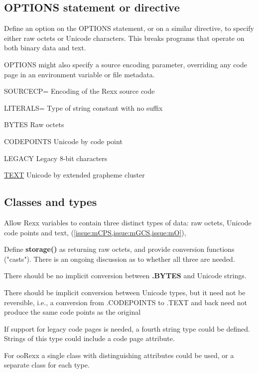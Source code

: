 \documentclass[b4paper]{article}
\begin{document}
\subsection{\textbf{OPTIONS} statement or directive}

Define an option on the OPTIONS statement, or on a similar directive,
to specify either raw octets or Unicode characters.
This breaks programs that operate on both binary data and text.

OPTIONS might also specify a source encoding parameter, overriding any
code page in an environment variable or file metadata.

\begin{definition}
\item[SOURCECP=] Encoding of the Rexx source code
\item[LITERALS=] Type of string constant with no suffix
\begin{definition}
\item[BYTES] Raw octets
\item[CODEPOINTS] Unicode by code point
\item[LEGACY] Legacy 8-bit characters
\item[\underline{TEXT}] Unicode by extended grapheme cluster
\end{definition}
\end{definition}

\subsection{Classes and types}

Allow Rexx variables to contain three distinct types of data: raw octets, Unicode code points and text,
(\cref{issue:mCPS,issue:mGCS,issue:mO}),

Define \textbf{storage()} as returning raw octets,
and provide conversion functions ("casts").
There is an ongoing discussion as to whether all three are needed.

There should be no implicit conversion between \textbf{.BYTES} and Unicode strings.

There should be implicit conversion between Unicode types, but it need not be reversible, i.e.,
a conversion from .CODEPOINTS to .TEXT and back need not produce the same code points as the original

If support for legacy code pages is needed, a fourth string type could be defined.
Strings of this type could include a code page attribute.

For ooRexx a single class with distinguishing attributes could be
used, or a separate class for each type.
\end{document}
